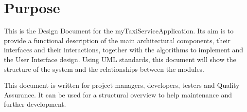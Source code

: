 \section{Purpose}
\label{sec:purpose}

This is the Design Document for the myTaxiServiceApplication. Its aim is to provide a functional description of the main architectural components, their interfaces and their interactions, together with the algorithms to implement and the User Interface design.
Using UML standards, this document will show the structure of the system and the relationships between the modules.

This document is written for project managers, developers, testers and Quality Assurance. It can be used for a structural overview to help maintenance and further development.
